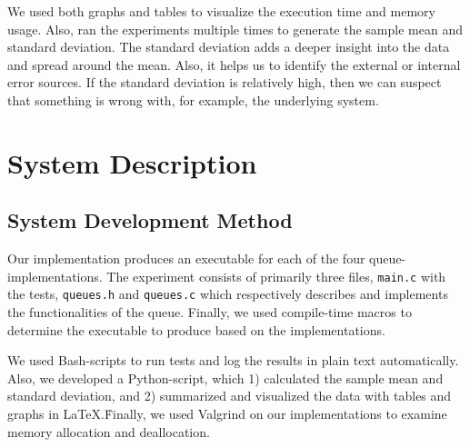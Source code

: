 \documentclass[a4paper,11pt]{kth-mag}
\newcommand*{\skippara}{\par\vspace{\baselineskip} \noindent}
\begin{document}
\skippara We used both graphs and tables to visualize the execution time and memory usage.
Also, ran the experiments multiple times to generate the sample mean and standard deviation.
The standard deviation adds a deeper insight into the data and spread around the mean.
Also, it helps us to identify the external or internal error sources.
If the standard deviation is relatively high, then we can suspect that something is wrong with, for example, the underlying system.




\chapter{System Description}\label{chapter:system}


\section{System Development Method}
Our implementation produces an executable for each of the four queue-implementations.
The experiment consists of primarily three files, \texttt{main.c} with the tests, \texttt{queues.h} and \texttt{queues.c} which respectively describes and implements the functionalities of the queue.
Finally, we used compile-time macros to determine the executable to produce based on the implementations.

\skippara We used Bash-scripts to run tests and log the results in plain text automatically.
Also, we developed a Python-script, which 1) calculated the sample mean and standard deviation, and 2) summarized and visualized the data with tables and graphs in \LaTeX.\.
Finally, we used Valgrind on our implementations to examine memory allocation and deallocation.
\end{document}
